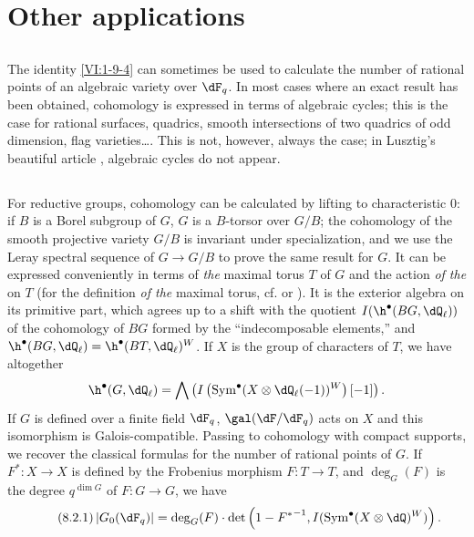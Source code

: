 \section{Other applications}\label{VI:8}





\subsection{}\label{VI:8-1}

The identity \ref{VI:1-9-4} can sometimes be used to calculate 
the number of rational points of an algebraic variety over $\dF_q$. In 
most cases where an exact result has been obtained, cohomology 
is expressed in terms of algebraic cycles; this is the case for rational 
surfaces, quadrics, smooth intersections of two quadrics of 
odd dimension, flag varieties\ldots. This is not, however, 
always the case; in Lusztig's beautiful article , algebraic cycles 
do not appear. 





\subsection{}\label{VI:8-2}

For reductive groups, cohomology can be calculated by lifting to 
characteristic $0$: if $B$ is a Borel subgroup of $G$, $G$ is a 
$B$-torsor over $G/B$; the cohomology of the smooth projective variety 
$G/B$ is invariant under specialization, and we use the Leray spectral sequence 
of $G\to G/B$ to prove the same result for $G$. It can be expressed 
conveniently in terms of \emph{the} maximal torus $T$ of $G$ and the action 
\emph{of the}  on $T$ (for the definition \emph{of the} maximal 
torus, cf.  or ). It is 
the exterior algebra on its primitive part, which agrees up to a shift 
with the quotient $I(\h^\bullet(B G,\dQ_\ell))$ of the cohomology of 
$B G$ formed by the ``indecomposable elements,'' and 
$\h^\bullet(B G,\dQ_\ell)=\h^\bullet(B T,\dQ_\ell)^W$. If $X$ is the group of 
characters of $T$, we have altogether 
\[
  \h^\bullet(G,\dQ_\ell) = \bigwedge \left(I\left(\operatorname{Sym}^\bullet(X\otimes \dQ_\ell(-1))^W\right)[-1]\right) \text{.}
\]
If $G$ is defined over a finite field $\dF_q$, $\gal(\dF/\dF_q)$ acts on $X$ 
and this isomorphism is Galois-compatible. Passing to 
cohomology with compact supports, we recover the classical formulas for the 
number of rational points of $G$. If $F^\ast:X\to X$ is defined by the 
Frobenius morphism $F:T\to T$, and $\deg_G(F)$ is the degree 
$q^{\dim G}$ of $F:G\to G$, we have 
\begin{equation*}\tag{8.2.1}\label{VI:eq:8-2-1}
  \left|G_0(\dF_q)\right| = \deg_G(F) \cdot \det\left(1-{F^\ast}^{-1},I(\operatorname{Sym}^\bullet(X\otimes \dQ)^W)\right) \text{.}
\end{equation*}

